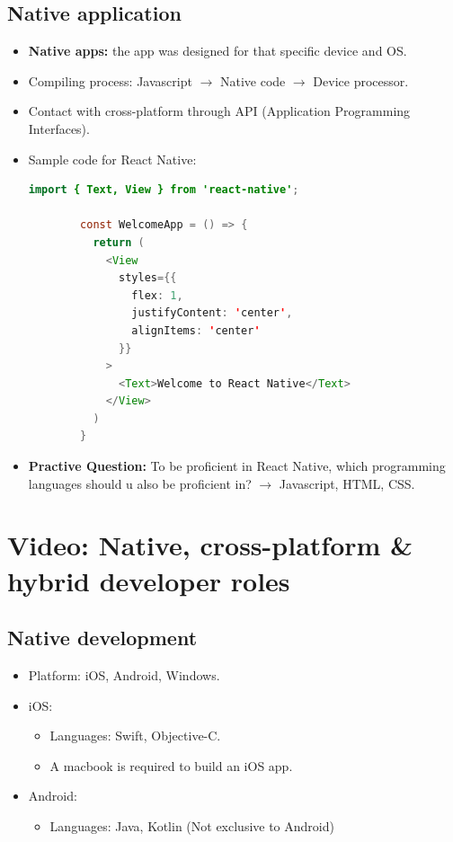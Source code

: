 \subsection{Native application}
\begin{itemize}
    \item \textbf{Native apps:} the app was designed for that specific device and OS.
    \item Compiling process: Javascript $\rightarrow$ Native code $\rightarrow$ Device processor.
    \item Contact with cross-platform through API (Application Programming Interfaces).
    \item Sample code for React Native:
    \begin{lstlisting}[language=Java, numbers=none]
        import { Text, View } from 'react-native';

        const WelcomeApp = () => { 
          return (
            <View
              styles={{ 
                flex: 1, 
                justifyContent: 'center', 
                alignItems: 'center' 
              }}
            >
              <Text>Welcome to React Native</Text>
            </View>
          )
        }
    \end{lstlisting}

    \item \textbf{Practive Question:} To be proficient in React Native, which programming languages should u also be proficient in? 
    $\rightarrow$ Javascript, HTML, CSS.
\end{itemize}

\section{Video: Native, cross-platform \& hybrid developer roles}
\subsection{Native development}
\begin{itemize}
    \item Platform: iOS, Android, Windows.
    \item iOS:
    \begin{itemize}[label=$\circ$]
        \item Languages: Swift, Objective-C.
        \item A macbook is required to build an iOS app.
    \end{itemize}
    \item Android: 
    \begin{itemize}[label=$\circ$]
        \item Languages: Java, Kotlin (Not exclusive to Android)
    \end{itemize}
\end{itemize}

